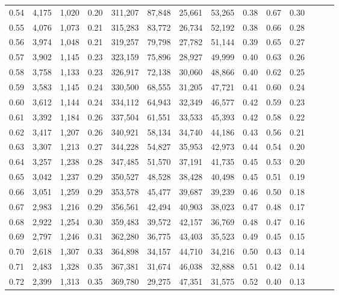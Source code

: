 \begin{tabular}{rrrrrrrrrrrrrr}
0.54 &  4,175 &  1,020 &  0.20 &  311,207 &   87,848 &  25,661 &  53,265 &  0.38 &  0.67 &      0.30 \\
0.55 &  4,076 &  1,073 &  0.21 &  315,283 &   83,772 &  26,734 &  52,192 &  0.38 &  0.66 &      0.28 \\
0.56 &  3,974 &  1,048 &  0.21 &  319,257 &   79,798 &  27,782 &  51,144 &  0.39 &  0.65 &      0.27 \\
0.57 &  3,902 &  1,145 &  0.23 &  323,159 &   75,896 &  28,927 &  49,999 &  0.40 &  0.63 &      0.26 \\
0.58 &  3,758 &  1,133 &  0.23 &  326,917 &   72,138 &  30,060 &  48,866 &  0.40 &  0.62 &      0.25 \\
0.59 &  3,583 &  1,145 &  0.24 &  330,500 &   68,555 &  31,205 &  47,721 &  0.41 &  0.60 &      0.24 \\
0.60 &  3,612 &  1,144 &  0.24 &  334,112 &   64,943 &  32,349 &  46,577 &  0.42 &  0.59 &      0.23 \\
0.61 &  3,392 &  1,184 &  0.26 &  337,504 &   61,551 &  33,533 &  45,393 &  0.42 &  0.58 &      0.22 \\
0.62 &  3,417 &  1,207 &  0.26 &  340,921 &   58,134 &  34,740 &  44,186 &  0.43 &  0.56 &      0.21 \\
0.63 &  3,307 &  1,213 &  0.27 &  344,228 &   54,827 &  35,953 &  42,973 &  0.44 &  0.54 &      0.20 \\
0.64 &  3,257 &  1,238 &  0.28 &  347,485 &   51,570 &  37,191 &  41,735 &  0.45 &  0.53 &      0.20 \\
0.65 &  3,042 &  1,237 &  0.29 &  350,527 &   48,528 &  38,428 &  40,498 &  0.45 &  0.51 &      0.19 \\
0.66 &  3,051 &  1,259 &  0.29 &  353,578 &   45,477 &  39,687 &  39,239 &  0.46 &  0.50 &      0.18 \\
0.67 &  2,983 &  1,216 &  0.29 &  356,561 &   42,494 &  40,903 &  38,023 &  0.47 &  0.48 &      0.17 \\
0.68 &  2,922 &  1,254 &  0.30 &  359,483 &   39,572 &  42,157 &  36,769 &  0.48 &  0.47 &      0.16 \\
0.69 &  2,797 &  1,246 &  0.31 &  362,280 &   36,775 &  43,403 &  35,523 &  0.49 &  0.45 &      0.15 \\
0.70 &  2,618 &  1,307 &  0.33 &  364,898 &   34,157 &  44,710 &  34,216 &  0.50 &  0.43 &      0.14 \\
0.71 &  2,483 &  1,328 &  0.35 &  367,381 &   31,674 &  46,038 &  32,888 &  0.51 &  0.42 &      0.14 \\
0.72 &  2,399 &  1,313 &  0.35 &  369,780 &   29,275 &  47,351 &  31,575 &  0.52 &  0.40 &      0.13 \\

\end{tabular}
